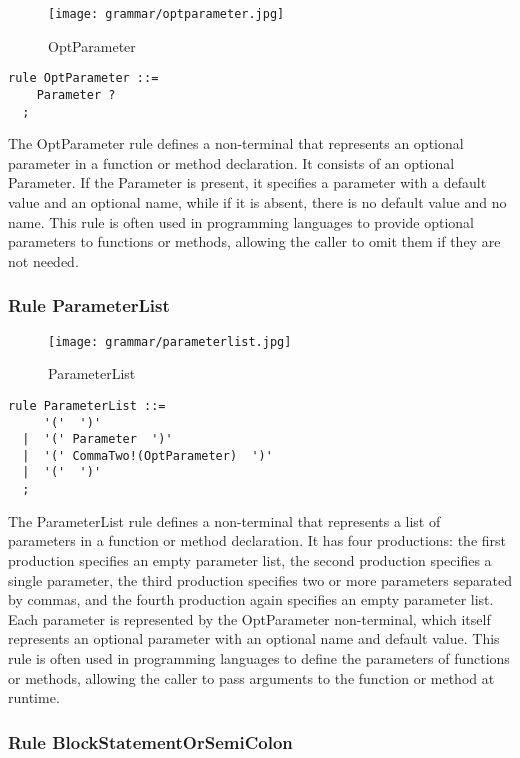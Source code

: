 \begin{figure}[!ht]
\centering
\texttt{[image: grammar/optparameter.jpg]}
\caption{OptParameter}
\end{figure}

\begin{lstlisting}
rule OptParameter ::=
    Parameter ?  
  ;
\end{lstlisting}

The OptParameter rule defines a non-terminal that represents an optional parameter in a function or method declaration. It consists of an optional Parameter. If the Parameter is present, it specifies a parameter with a default value and an optional name, while if it is absent, there is no default value and no name. This rule is often used in programming languages to provide optional parameters to functions or methods, allowing the caller to omit them if they are not needed.

\subsubsection*{Rule ParameterList}

\begin{figure}[!ht]
\centering
\texttt{[image: grammar/parameterlist.jpg]}
\caption{ParameterList}
\end{figure}

\begin{lstlisting}
rule ParameterList ::=
     '('  ')' 
  |  '(' Parameter  ')' 
  |  '(' CommaTwo!(OptParameter)  ')' 
  |  '('  ')' 
  ;
\end{lstlisting}

The ParameterList rule defines a non-terminal that represents a list of parameters in a function or method declaration. It has four productions: the first production specifies an empty parameter list, the second production specifies a single parameter, the third production specifies two or more parameters separated by commas, and the fourth production again specifies an empty parameter list. Each parameter is represented by the OptParameter non-terminal, which itself represents an optional parameter with an optional name and default value. This rule is often used in programming languages to define the parameters of functions or methods, allowing the caller to pass arguments to the function or method at runtime.

\subsubsection*{Rule BlockStatementOrSemiColon}

